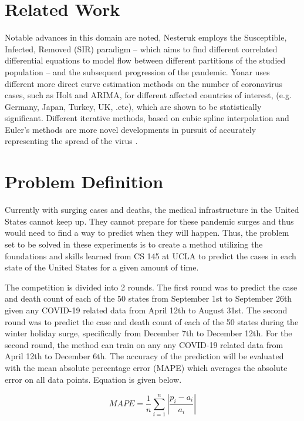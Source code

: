 \documentclass[sigconf,nonacm]{acmart}
\begin{document}
\section{Related Work}
Notable advances in this domain are noted, Nesteruk \cite{Nesteruk} employs the Susceptible, Infected, Removed (SIR) paradigm
– which aims to find different correlated differential equations to model flow between different partitions of the 
studied population – and the subsequent progression of the pandemic. Yonar \cite{EJMO} uses different more direct curve estimation methods
on the number of coronavirus cases, such as Holt and ARIMA, for different affected countries of interest, (e.g. Germany, Japan, Turkey, UK, .etc),
which are shown to be statistically significant. Different iterative methods, based on cubic spline interpolation and Euler's methods
are more novel developments in pursuit of accurately representing the spread of the virus \cite{APPADU2020}.

\section{Problem Definition}
Currently with surging cases and deaths, the medical infrastructure in the United States cannot keep up. They cannot prepare for these pandemic surges and thus would need to find a way to predict when they will happen. Thus, the problem set to be solved in these experiments is to create a method utilizing the foundations and skills learned from CS 145 at UCLA to predict the cases in each state of the United States for a given amount of time. 

The competition is divided into 2 rounds. The first round was to predict the case and death count of each of the 50 states from September 1st to September 26th given any COVID-19 related data from April 12th to August 31st. The second round was to predict the case and death count of each of the 50 states during the winter holiday surge, specifically from December 7th to December 12th. For the second round, the method can train on any any COVID-19 related data from April 12th to December 6th. 
The accuracy of the prediction will be evaluated with the mean absolute percentage error (MAPE) which averages the absolute error on all data points. Equation is given below.

$$MAPE = \frac{1}{n} \sum_{i = 1}^{n} |\frac{p_i - a_i}{a_i} |$$
\end{document}
